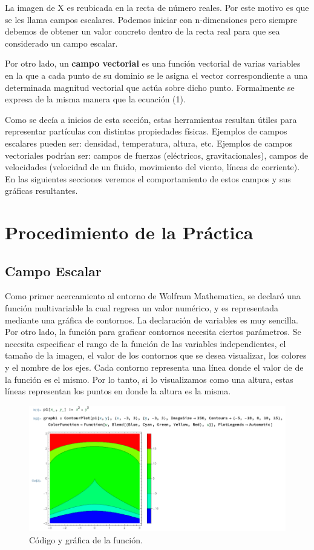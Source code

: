 \documentclass[12pt, letterpaper]{article}
\begin{document}
La imagen de X es reubicada en la recta de número reales. Por este motivo es que se les llama campos escalares. Podemos iniciar con n-dimensiones pero siempre debemos de obtener un valor concreto dentro de la recta real para que sea considerado un campo escalar.

Por otro lado, un \textbf{campo vectorial} es una función vectorial de varias variables en la que a cada punto de su dominio se le asigna el vector correspondiente a una determinada magnitud vectorial que actúa sobre dicho punto. Formalmente se expresa de la misma manera que la ecuación (1).

Como se decía a inicios de esta sección, estas herramientas resultan útiles para representar partículas con distintas propiedades físicas. Ejemplos de campos escalares pueden ser: densidad, temperatura, altura, etc. Ejemplos de campos vectoriales podrían ser: campos de fuerzas (eléctricos, gravitacionales), campos de velocidades (velocidad de un fluido, movimiento del viento, líneas de corriente). En las siguientes secciones veremos el comportamiento de estos campos y sus gráficas resultantes.

\section*{Procedimiento de la Práctica}

\subsection*{Campo Escalar}
Como primer acercamiento al entorno de Wolfram Mathematica, se declaró una función multivariable la cual regresa un valor numérico, y es representada mediante una gráfica de contornos. La declaración de variables es muy sencilla. Por otro lado, la función para graficar contornos necesita ciertos parámetros. Se necesita especificar el rango de la función de las variables independientes, el tamaño de la imagen, el valor de los contornos que se desea visualizar, los colores y el nombre de los ejes. Cada contorno representa una línea donde el valor de de la función es el mismo. Por lo tanto, si lo visualizamos como una altura, estas líneas representan los puntos en donde la altura es la misma.

\begin{figure}[H]
	\centering
	\includegraphics[width=\textwidth]{1.png}
	\caption{Código y gráfica de la función.}
\end{figure}
\end{document}
